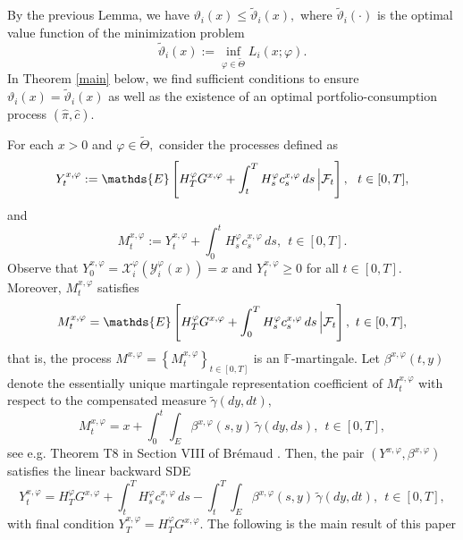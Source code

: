 \documentclass[11pt]{article}
\theoremstyle{plain}
\theoremstyle{definition}
\numberwithin{equation}{section}
\newcommand{\calF}{\mathcal{F}}
\newcommand{\Y}{\mathcal{Y}}
\newcommand{\calX}{\mathcal{X}}
\newcommand{\set}[1]{\left\{#1\right\}}
\newcommand{\calI}{\mathcal{I}}
\newcommand{\eps}{\varepsilon}
\newcommand{\Exp}{\mathds{E}}
\newcommand{\Fil}{\mathds{F}}
\begin{document}


By the previous Lemma, we have $\vartheta_i(x)\le \tilde{\vartheta}_i(x),$ where $\tilde{\vartheta}_i(\cdot)$ is the optimal value function of the minimization problem
\begin{equation}\label{dual}
\tilde{\vartheta}_i(x):=\inf_{\varphi\in\widetilde{\Theta}}L_i(x;\varphi).
\end{equation}
In Theorem \ref{main} below, we find sufficient conditions to ensure $\vartheta_i(x)=\tilde{\vartheta}_i(x)$ as well as the existence of an optimal portfolio-consumption process $(\hat{\pi},\hat{c}).$

For each $x>0$ and $\varphi\in \widetilde{\Theta},$ consider the processes defined as
\[
Y_t^{x,\varphi}:=\Exp\left[\Bigl.H_T^\varphi G^{x,\varphi}+\int_t^TH_s^\varphi c_s^{x,\varphi}\,ds\,\Bigr|\calF_t\right], \ \ t\in [0,T],
\]
and
\[
M_t^{x,\varphi}  := Y_t^{x,\varphi}+\int_0^tH_s^{\varphi}c_s^{x,\varphi}\,ds, \ \ t\in [0,T].
\]
Observe that  $Y_0^{x,\varphi} = \calX_i^\varphi(\Y_i^\varphi(x))= x$ and $Y_t^{x,\varphi} \geq 0 $ for all  $t \in \left[0,T\right].$ Moreover, $M_t^{x,\varphi}$ satisfies
\begin{equation}
M_t^{x,\varphi}=\Exp\left[ H_T^{\varphi} G^{x,\varphi}+\Bigl.\int_0^T H_s^{\varphi} c_s^{x,\varphi}\, ds\, \Bigr|  \calF_t \right], \ t \in [0,T],
\end{equation}
that is, the process $M^{x,\varphi}=\set{M_t^{x,\varphi}}_{t\in[0,T]}$ is an $\Fil$-martingale. Let $\beta^{x,\varphi}(t,y)$ denote the essentially unique martingale representation coefficient of $ M_t^{x,\varphi}$ with respect to the compensated measure $\tilde{\gamma}(dy,dt),$   %
\begin{equation}
M_t^{x,\varphi} = x+\int_0^t{\int_{E}} {\beta^{x,\varphi}(s,y)}\,{\tilde{\gamma}}(dy,ds), \ \ t\in [0,T],
\end{equation}
see e.g. Theorem T8 in Section VIII of Br\'{e}maud \cite{bremaud}. Then, the pair $(Y^{x,\varphi},\beta^{x,\varphi})$ satisfies the linear backward SDE
\begin{equation}\label{bsdeY}
Y_t^{x,\varphi}=H_T^\varphi G^{x,\varphi}+\int_t^T H_s^\varphi c_s^{x,\varphi}\,ds-\int_t^T\!\int_E\beta^{x,\varphi}(s,y)\,{\tilde{\gamma}}(dy,dt), \ \ t\in [0,T],
\end{equation}
with final condition $Y_T^{x,\varphi}=H_T^\varphi G^{x,\varphi}.$ The following is the main result of this paper
\end{document}
